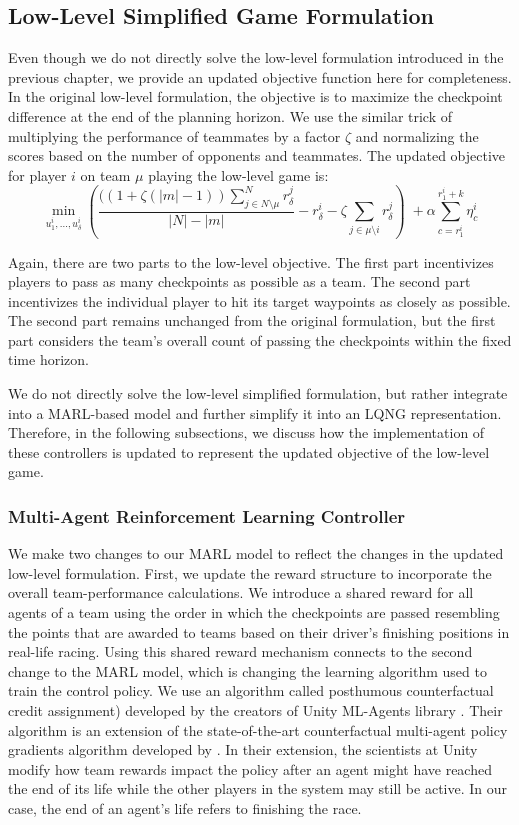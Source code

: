 \subsection{Low-Level Simplified Game Formulation}
Even though we do not directly solve the low-level formulation introduced in the previous chapter, we provide an updated objective function here for completeness. In the original low-level formulation, the objective is to maximize the checkpoint difference at the end of the planning horizon. We use the similar trick of multiplying the performance of teammates by a factor $\zeta$ and normalizing the scores based on the number of opponents and teammates. The updated objective for player $i$ on team $\mu$ playing the low-level game is:
\begin{equation} \label{eq:ll_team_obj}
    \min_{u^i_{1}, ..., u^i_{\delta}} (\frac{((1+\zeta(|m|-1))\sum^N_{j \in N\setminus \mu}r^j_{\delta}}{|N|-|m|} -  r^i_{\delta} - \zeta\sum_{j \in \mu \setminus i}r^j_\delta) \; +  
    \alpha \sum_{c={r^i_{1}}}^{{r^i_{1}}+k} \eta^i_c
\end{equation}

Again, there are two parts to the low-level objective. The first part incentivizes players to pass as many checkpoints as possible as a team. The second part incentivizes the individual player to hit its target waypoints as closely as possible. The second part remains unchanged from the original formulation, but the first part considers the team's overall count of passing the checkpoints within the fixed time horizon. 

We do not directly solve the low-level simplified formulation, but rather integrate into a MARL-based model and further simplify it into an LQNG representation. Therefore, in the following subsections, we discuss how the implementation of these controllers is updated to represent the updated objective of the low-level game.

\subsubsection{Multi-Agent Reinforcement Learning Controller}
We make two changes to our MARL model to reflect the changes in the updated low-level formulation. First, we update the reward structure to incorporate the overall team-performance calculations. We introduce a shared reward for all agents of a team using the order in which the checkpoints are passed resembling the points that are awarded to teams based on their driver's finishing positions in real-life racing. Using this shared reward mechanism connects to the second change to the MARL model, which is changing the learning algorithm used to train the control policy. We use an algorithm called posthumous counterfactual credit assignment) developed by the creators of Unity ML-Agents library \cite{poca}. Their algorithm is an extension of the state-of-the-art counterfactual multi-agent policy gradients algorithm developed by \citet{coma}. In their extension, the scientists at Unity modify how team rewards impact the policy after an agent might have reached the end of its life while the other players in the system may still be active. In our case, the end of an agent's life refers to finishing the race. 

